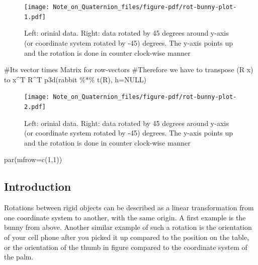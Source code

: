 \documentclass[
  letterpaper,
  DIV=11,
  numbers=noendperiod]{scrartcl}
\newenvironment{Shaded}{\begin{snugshade}}{\end{snugshade}}
\newcommand{\AttributeTok}[1]{\textcolor[rgb]{0.40,0.45,0.13}{#1}}
\newcommand{\CommentTok}[1]{\textcolor[rgb]{0.37,0.37,0.37}{#1}}
\newcommand{\ConstantTok}[1]{\textcolor[rgb]{0.56,0.35,0.01}{#1}}
\newcommand{\DecValTok}[1]{\textcolor[rgb]{0.68,0.00,0.00}{#1}}
\newcommand{\FunctionTok}[1]{\textcolor[rgb]{0.28,0.35,0.67}{#1}}
\newcommand{\NormalTok}[1]{\textcolor[rgb]{0.00,0.23,0.31}{#1}}
\newcommand{\SpecialCharTok}[1]{\textcolor[rgb]{0.37,0.37,0.37}{#1}}
\begin{document}
\begin{figure}[H]

{\centering \texttt{[image: Note\_on\_Quaternion\_files/figure-pdf/rot-bunny-plot-1.pdf]}

}

\caption{Left: orinial data. Right: data rotated by 45 degrees around
y-axis (or coordinate system rotated by -45) degrees. The y-axis points
up and the rotation is done in counter clock-wise manner}

\end{figure}

\begin{Shaded}
\begin{Highlighting}[]
\CommentTok{\#It\textquotesingle{}s vector times Matrix for row{-}vectors}
\CommentTok{\#Therefore we have to transpose (R x) to x\^{}T R\^{}T}
\FunctionTok{p3d}\NormalTok{(rabbit }\SpecialCharTok{\%*\%} \FunctionTok{t}\NormalTok{(R), }\AttributeTok{h=}\ConstantTok{NULL}\NormalTok{) }
\end{Highlighting}
\end{Shaded}

\begin{figure}[H]

{\centering \texttt{[image: Note\_on\_Quaternion\_files/figure-pdf/rot-bunny-plot-2.pdf]}

}

\caption{Left: orinial data. Right: data rotated by 45 degrees around
y-axis (or coordinate system rotated by -45) degrees. The y-axis points
up and the rotation is done in counter clock-wise manner}

\end{figure}

\begin{Shaded}
\begin{Highlighting}[]
\FunctionTok{par}\NormalTok{(}\AttributeTok{mfrow=}\FunctionTok{c}\NormalTok{(}\DecValTok{1}\NormalTok{,}\DecValTok{1}\NormalTok{))}
\end{Highlighting}
\end{Shaded}

\hypertarget{introduction}{%
\subsection{Introduction}\label{introduction}}

Rotations between rigid objects can be described as a linear
transformation from one coordinate system to another, with the same
origin. A first example is the bunny from above. Another similar example
of such a rotation is the orientation of your cell phone after you
picked it up compared to the position on the table, or the orientation
of the thumb in figure compared to the coordinate system of the palm.
\end{document}
